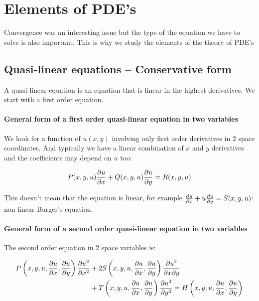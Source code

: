 
\chapter{Elements of PDE's}

Convergence was an interesting issue but the type of the equation we have to solve is also important. This is why we study the elements of the theory of PDE’s

\section{Quasi-linear equations – Conservative form}
A quasi-linear equation is an equation that is linear in the highest derivatives. We start with a first order equation. 

\subsubsection{General form of a first order quasi-linear equation in two variables}
We look for a function of $u(x,y)$ involving only first order derivatives in 2 space coordinates. And typically we have a linear combination of $x$ and $y$ derivatives and the coefficients may depend on $u$ too:

\begin{equation}
P(x,y,u) \frac{\partial u}{\partial x} + Q(x,y,u) \frac{\partial u}{\partial y} = R(x,y,u)
\label{2.1}
\end{equation}

This doesn't mean that the equation is linear, for example $\frac{\partial u}{\partial x} + u \frac{\partial u}{\partial y} = S(x,y,u)$: non linear Burger's equation. 

\subsubsection{General form of a second order quasi-linear equation in two variables}

The second order equation in 2 space variables is: 

\begin{equation}
\begin{aligned}
P\left(x,y,u, \frac{\partial u}{\partial x}, \frac{\partial u}{\partial y}\right) \frac{\partial u^2}{\partial x^2} &+ 2 S\left(x,y,u, \frac{\partial u}{\partial x}, \frac{\partial u}{\partial y}\right) \frac{\partial u^2}{\partial x \partial y}\\
&+ T\left(x,y,u, \frac{\partial u}{\partial x}, \frac{\partial u}{\partial y}\right) \frac{\partial u^2}{\partial y^2} = H\left(x,y,u, \frac{\partial u}{\partial x}, \frac{\partial u}{\partial y}\right)
\end{aligned}
\end{equation}

